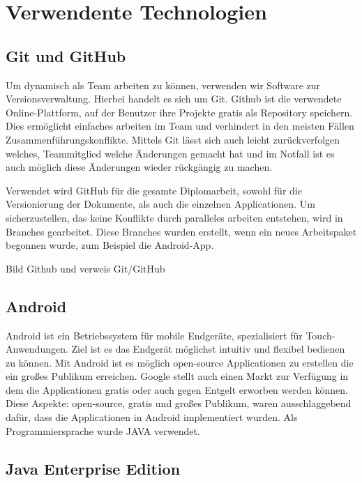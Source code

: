 \chapter{Verwendente Technologien}
\section{Git und GitHub}
Um dynamisch als Team arbeiten zu können, verwenden wir Software zur Versionsverwaltung. Hierbei handelt es sich um Git. 
Github ist die verwendete Online-Plattform, auf der Benutzer ihre Projekte gratis als Repository speichern. Dies ermöglicht einfaches arbeiten im Team und verhindert in den meisten Fällen Zusammenführungskonflikte. Mittels Git lässt sich auch leicht zurückverfolgen welches, Teammitglied welche Änderungen gemacht hat und im Notfall ist es auch möglich diese Änderungen wieder rückgängig zu machen.

Verwendet wird GitHub für die gesamte Diplomarbeit, sowohl für die Versionierung der Dokumente, als auch  die einzelnen Applicationen. Um sicherzustellen, das keine Konflikte durch paralleles arbeiten entstehen, wird in Branches gearbeitet. Diese Branches wurden erstellt, wenn ein neues Arbeitspaket begonnen wurde, zum Beispiel die Android-App.

Bild Github und verweis Git/GitHub

\section{Android}

Android ist ein Betriebssystem für mobile Endgeräte, spezialisiert für Touch-Anwendungen. Ziel ist es das Endgerät möglichst intuitiv und flexibel bedienen zu können. Mit Android ist es möglich open-source Applicationen zu erstellen die ein großes Publikum erreichen. Google stellt auch einen Markt zur Verfügung in dem die Applicationen gratis oder auch gegen Entgelt erworben werden können.
Diese Aspekte: open-source, gratis und großes Publikum, waren ausschlaggebend dafür, dass die Applicationen in Android implementiert wurden. Als Programmiersprache wurde JAVA verwendet.


\section{Java Enterprise Edition} 